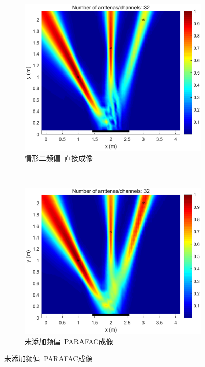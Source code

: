 \begin{figure}[H]
  \begin{subfigure}[t]{.3\linewidth}
    \centering
    \includegraphics[width=1\textwidth]{figures/compare/CSI_freq2.eps}
    \caption{情形二频偏~直接成像}
  \end{subfigure}
  \\
  \begin{subfigure}[t]{.3\linewidth}
    \centering
    \includegraphics[width=1\textwidth]{figures/compare/TPF_without_freq.eps}
    \caption{未添加频偏~PARAFAC成像}
  \end{subfigure}

\end{figure}
